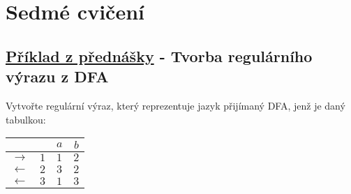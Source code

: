 \section{Sedmé cvičení}

\subsection{\href{https://youtu.be/8tSYD1bX4M8?list=PLQL6z4JeTTQkLuzI78OTnfYBclE1g0UjS&t=519}{Příklad z přednášky} - Tvorba regulárního výrazu z DFA }
Vytvořte regulární výraz, který reprezentuje jazyk přijímaný DFA, jenž je daný tabulkou:
\begin{center}
    \begin{tabular}{|r r|c c|}
        \hline
        &  & $a$ & $b$ \\ \hline \hline
        $\rightarrow$ & $1$ & $1$ & $2$ \\
        $\leftarrow$  & $2$ & $3$ & $2$ \\
        $\leftarrow$  & $3$ & $1$ & $3$ \\
        \hline
    \end{tabular}
\end{center}

